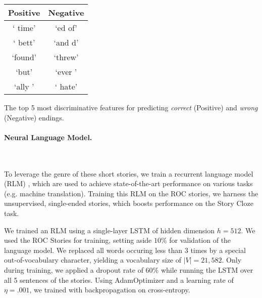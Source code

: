 \documentclass[11pt,a4paper]{article}
\newcommand{\ms}[1]{{\color{cyan}\{\textit{#1}\}$_{ms}$}}
\newcommand{\roy}[1]{\footnote{\color{red}{\textbf{Roy: #1}}}}
\renewcommand{\ms}[1]{}
\renewcommand{\roy}[1]{}
\begin{document}
\begin{table}[!t]
\begin{center}
\small
\begin{tabular}{|c|c|} \hline
{\bf Positive} & {\bf Negative}\\ \hline
` time' & `ed of'\\ \hline
` bett' & `and d'\\ \hline
`found' & `threw'\\ \hline
`but' & `ever '\\ \hline
`ally ' & ` hate'\\ \hline

\end{tabular}
\end{center}
\caption{\label{features}}
The top 5 most discriminative features for predicting {\it correct} (Positive)  and {\it wrong} (Negative) endings.\end{table}



\paragraph{Neural Language Model.}
~\ms{This needs to be placed somewhere else LOL}
~\ms{Below is a messy dump of all the hyper parameters... Didn't know how many details were needed}
\roy{The level of description seems fine (we might remove some of them if space is an issue, but for now it's good. What I'm missing here are (a) an introductory 1-2  sentences to what are we doing here (I realize that it is not 100\% clear from the intro what is the role of these experiments other than showing that we have STOA results, so this can come later\\
(b) A one-sentence description of your model. Currently, there is no clear separation between the model (RNN using LSTM) and the technical details. 
Some general description of the model, and specifically the motivation behind (nothing fancy, just saying that we applied state-of-the-art LM tools, 
which resemble the tools the authors had in mind when they designed the task).}

To leverage the genre of these short stories, we train a recurrent language model (RLM) \cite{mikolov2010recurrent}, which are used to achieve state-of-the-art performance on various tasks (e.g. machine translation). Training this RLM on the ROC stories, we harness the unsupervised, single-ended stories, which boosts performance on the Story Cloze task.

We trained an RLM using a single-layer LSTM \cite{hochreiter1997long} of hidden dimension $h=512$.
We used the ROC Stories for training, setting aside $10\%$ for validation of the language model. We replaced all words occuring less than 3 times by a special out-of-vocabulary character, yielding a vocabulary size of $|V|=21,582$.
Only during training, we applied a dropout rate of 60\% while running the LSTM over all 5 sentences of the stories. Using AdamOptimizer \cite{kingma2014adam} and a learning rate of $\eta=.001$, we trained with backpropagation on cross-entropy. %
\end{document}

